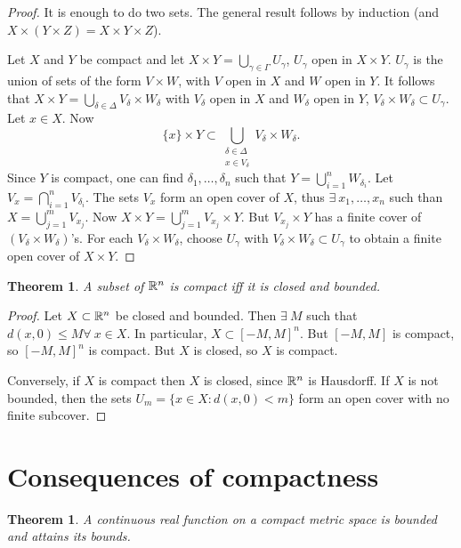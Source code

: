 \documentclass{notes}
\theoremstyle{plain}
\newtheorem{theorem}[proposition]{Theorem}
\begin{document}
\begin{proof}
It is enough to do two sets.  The general result follows by induction 
(and $X \times (Y \times Z) = X \times Y \times Z$).

Let $X$ and $Y$ be compact and let $X \times Y = \bigcup_{\gamma \in \Gamma}
U_\gamma$, $U_\gamma$ open in $X \times Y$.  $U_\gamma$ is the union of sets
of the form $V \times W$, with $V$ open in $X$ and $W$ open in $Y$.  It
follows that $X \times Y = \bigcup_{\delta \in \Delta} V_\delta \times 
W_\delta$ with $V_\delta$ open in $X$ and $W_\delta$ open in $Y$,
$V_\delta \times W_\delta \subset U_\gamma$.  Let $x \in X$.  Now
\[
\{ x \} \times Y 
\subset 
\bigcup_{\substack{\delta \in \Delta \\ x \in V_\delta}} V_\delta \times
W_\delta.
\]
Since $Y$ is compact, one can find $\delta_1, \dots, \delta_n$ such that
$Y = \bigcup_{i=1}^n W_{\delta_i}$.  Let $V_x = \bigcap_{i=1}^n V_{\delta_i}$.
The sets $V_x$ form an open cover of $X$, thus $\exists\ x_1, \dots, x_n$
such than $X = \bigcup_{j=1}^m V_{x_j}$.  Now $X \times Y = \bigcup_{j=1}^m
V_{x_j} \times Y$.  But $V_{x_j} \times Y$ has a finite cover of $(V_\delta
\times W_\delta)$'s.  For each $V_\delta \times W_\delta$, choose $U_\gamma$
with $V_\delta \times W_\delta \subset U_\gamma$ to obtain a finite open
cover of $X \times Y$. 
\end{proof}

\begin{theorem}
A subset of $\mathbb{R}^n$ is compact iff it is closed and bounded.
\end{theorem}

\begin{proof}
Let $X \subset \mathbb{R}^n$ be closed and bounded.  Then $\exists\ M$ such that
$d(x,0) \le M \forall\ x \in X$.  In particular, $X \subset [-M,M]^n$. But
$[-M,M]$ is compact, so $[-M,M]^n$ is compact.  But $X$ is closed, so $X$ is
compact.

Conversely, if $X$ is compact then $X$ is closed, since $\mathbb{R}^n$ is Hausdorff.
If $X$ is not bounded, then the sets $U_m = \{ x \in X : d(x,0) < m \}$ form
an open cover with no finite subcover.
\end{proof}

\section{Consequences of compactness}

\begin{theorem}
A continuous real function on a compact metric space is bounded and
attains its bounds.
\end{theorem}
\end{document}
